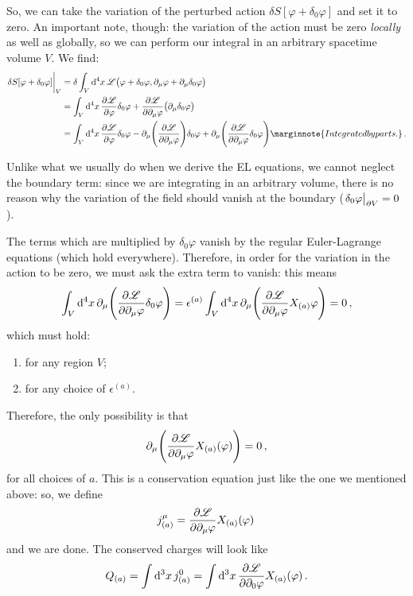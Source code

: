 \documentclass[main.tex]{subfiles}
\begin{document}
So, we can take the variation of the perturbed action \(\delta S[\varphi + \delta_0 \varphi ]\) and set it to zero. An important note, though: the variation of the action must be zero \emph{locally} as well as globally, so we can perform our integral in an arbitrary spacetime volume \(V\). We find: 
%
\begin{align}
\eval{\delta S [ \varphi + \delta_0 \varphi ]}_{V} &= \delta  \int_{V} \dd[4]{x} \mathscr{L} \qty(\varphi + \delta_0 \varphi , \partial_{\mu } \varphi + \partial_{\mu } \delta_0 \varphi  )  \\
&= \int_{V} \dd[4]{x} \pdv{\mathscr{L}}{\varphi } \delta_0 \varphi + \pdv{\mathscr{L}}{\partial_{\mu}\varphi } \qty(\partial_{\mu } \delta_0 \varphi )  \\
&= \int_{V} \dd[4]{x} \pdv{\mathscr{L}}{\varphi } \delta_0 \varphi - \partial_{\mu } \qty(\pdv{\mathscr{L}}{\partial_{\mu}\varphi } ) \delta_0 \varphi  + \partial_{\mu } \qty( \pdv{\mathscr{L}}{\partial_{\mu } \varphi } \delta_0 \varphi ) \marginnote{Integrated by parts.}
\,.
\end{align}

Unlike what we usually do when we derive the EL equations, we cannot neglect the boundary term: since we are integrating in an arbitrary volume, there is no reason why the variation of the field should vanish at the boundary (\(\eval{\delta_0 \varphi }_{\partial V} =0\)). 

The terms which are multiplied by \(\delta_0 \varphi \) vanish by the regular Euler-Lagrange equations (which hold everywhere). Therefore, in order for the variation in the action to be zero, we must ask the extra term to vanish: this means 
%
\begin{align}
\int_{V} \dd[4]{x} \partial_{\mu } \qty(\pdv{\mathscr{L}}{\partial_{\mu }\varphi } \delta_0 \varphi ) 
=\epsilon^{(a)} \int_{V} \dd[4]{x} \partial_{\mu } \qty( \pdv{\mathscr{L}}{\partial_{\mu } \varphi } X_{(a)} \varphi )
= 0
\,,
\end{align}
%
which must hold: 
\begin{enumerate}
    \item for any region \(V\);
    \item for any choice of \(\epsilon^{(a)}\).
\end{enumerate}

Therefore, the only possibility is that 
%
\begin{align}
\partial_{\mu  }\qty( \pdv{\mathscr{L}}{\partial_{\mu } \varphi } X_{(a)} (\varphi) ) = 0 
\,,
\end{align}
%
for all choices of \(a\). This is a conservation equation just like the one we mentioned above: so, we define 
%
\begin{align}
j^{\mu }_{(a)} = \pdv{\mathscr{L}}{\partial_{\mu } \varphi } X_{(a)} (\varphi)
\,
\end{align}
%
and we are done.
The conserved charges will look like 
%
\begin{align}
Q_{(a)} = \int \dd[3]{x} j^{0}_{(a)} = \int \dd[3]{x} \pdv{\mathscr{L}}{\partial_{0} \varphi } X_{(a)} (\varphi )
\,.
\end{align}
\end{document}
